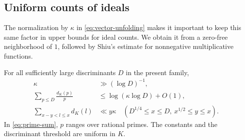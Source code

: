 \subsection{Uniform counts of ideals}

The normalization by $\kappa$ in \eqref{eq:vector-unfolding} makes it
important to keep this same factor in upper bounds for ideal counts.
We obtain it from a zero-free neighborhood of $1$, followed by Shiu's
estimate for nonnegative multiplicative functions.

\begin{lemma}\label{lem:ideal-estimate}
For all sufficiently large discriminants $D$ in the present family,
\begin{align}
 \kappa&\gg (\log D)^{-1},                         \label{eq:residue-lower}\\
 \sum_{p\le D}\frac{d_K(p)}p
   &\le \log(\kappa\log D)+O(1),                 \label{eq:prime-sum}\\
 \sum_{x-y<l\le x}d_K(l)&\ll y\kappa
 \quad\left(D^{1/4}\le x\le D,
                    \ x^{1/2}\le y\le x\right).  \label{eq:ideal-interval}
\end{align}
In \eqref{eq:prime-sum}, $p$ ranges over rational primes.  The constants
and the discriminant threshold are uniform in $K$.
\end{lemma}

